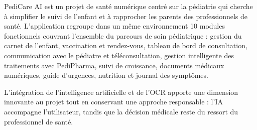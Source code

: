 \documentclass[11pt,a4paper]{article}
\begin{document}
PediCare AI est un projet de santé numérique centré sur la pédiatrie qui cherche à simplifier le suivi de l'enfant et à rapprocher les parents des professionnels de santé. L'application regroupe dans un même environnement 10 modules fonctionnels couvrant l'ensemble du parcours de soin pédiatrique : gestion du carnet de l'enfant, vaccination et rendez-vous, tableau de bord de consultation, communication avec le pédiatre et téléconsultation, gestion intelligente des traitements avec PediPharma, suivi de croissance, documents médicaux numériques, guide d'urgences, nutrition et journal des symptômes.

L'intégration de l'intelligence artificielle et de l'OCR apporte une dimension innovante au projet tout en conservant une approche responsable : l'IA accompagne l'utilisateur, tandis que la décision médicale reste du ressort du professionnel de santé.
\end{document}
